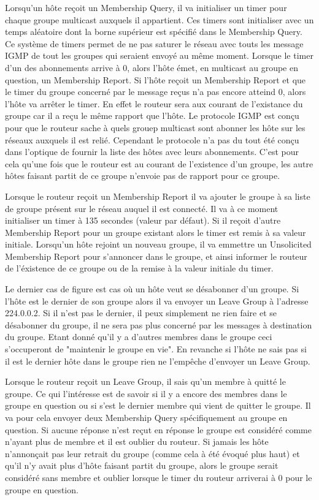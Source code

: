 Lorsqu'un hôte reçoit un Membership Query, il va initialiser un timer pour chaque
groupe multicast auxquels il appartient. Ces timers sont initialiser avec un temps
aléatoire dont la borne supérieur est spécifié dans le Membership Query. Ce système
de timers permet de ne pas saturer le réseau avec touts les message IGMP de tout les
groupes qui seraient envoyé au même moment.
Lorsque le timer d'un des abonnements arrive à 0, alors l'hôte émet, en multicast au
groupe en question, un Membership Report.
Si l'hôte reçoit un Membership Report et que le timer du groupe concerné par le
message reçus n'a pas encore atteind 0, alors l'hôte va arrêter le timer. En effet le
routeur sera aux courant de l'existance du groupe car il a reçu le même rapport que
l'hôte.
Le protocole IGMP est conçu pour que le routeur sache à quels grouep multicast sont
abonner les hôte sur les réseaux auxquels il est relié. Cependant le protocole n'a pas
du tout été conçu dans l'optique de fournir la liste des hôtes avec leurs abonnements.
C'est pour cela qu'une fois que le routeur est au courant de l'existence d'un groupe,
les autre hôtes faisant partit de ce groupe n'envoie pas de rapport pour ce groupe.

Lorsque le routeur reçoit un Membership Report il va ajouter le groupe à sa liste de groupe
présent sur le réseau auquel il est connecté. Il va à ce moment initialiser un timer
à 135 secondes (valeur par défaut).
Si il reçoit d'autre Membership Report pour un groupe existant alors le timer est
remis à sa valeur initiale.
Lorsqu'un hôte rejoint un nouveau groupe, il va emmettre un Unsolicited Membership Report
pour s'annoncer dans le groupe, et ainsi informer le routeur de l'éxistence de ce groupe
ou de la remise à la valeur initiale du timer.

Le dernier cas de figure est cas où un hôte veut se désabonner d'un groupe. Si l'hôte
est le dernier de son groupe alors il va envoyer un Leave Group à l'adresse 224.0.0.2.
Si il n'est pas le dernier, il peux simplement ne rien faire et se désabonner du groupe,
il ne sera pas plus concerné par les messages à destination du groupe. Etant donné qu'il
y a d'autres membres dans le groupe ceci s'occuperont de "maintenir le groupe en vie".
En revanche si l'hôte ne sais pas si il est le dernier hôte dans le groupe rien ne l'empêche
d'envoyer un Leave Group.

Lorsque le routeur reçoit un Leave Group, il sais qu'un membre à quitté le groupe. Ce qui
l'intéresse est de savoir si il y a encore des membres dans le groupe en question ou
si s'est le dernier membre qui vient de quitter le groupe. Il va pour cela envoyer deux
Membership Query spécifiquement au groupe en question. Si aucune réponse n'est reçut en
réponse le groupe est considéré comme n'ayant plus de membre et il est oublier du routeur.
Si jamais les hôte n'annonçait pas leur retrait du groupe (comme cela à été évoqué plus haut)
et qu'il n'y avait plus d'hôte faisant partit du groupe, alors le groupe serait considéré
sans membre et oublier lorsque le timer du routeur arriverai à 0 pour le groupe en question.

